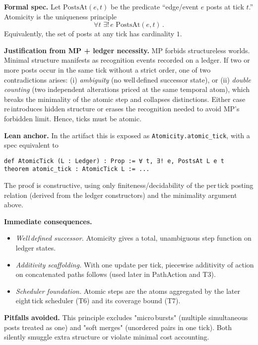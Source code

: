 \documentclass[11pt]{article}
\begin{document}
\medskip
\textbf{Formal spec.} Let $\mathrm{PostsAt}(e,t)$ be the predicate “edge/event $e$ posts at tick $t$.” Atomicity is the uniqueness principle
\begin{equation*}
  \forall t\,\, \exists!\, e\,\, \mathrm{PostsAt}(e,t)\,.
\end{equation*}
Equivalently, the set of posts at any tick has cardinality $1$.

\textbf{Justification from MP + ledger necessity.} MP forbids structureless worlds. Minimal structure manifests as recognition events recorded on a ledger. If two or more posts occur in the same tick without a strict order, one of two contradictions arises: (i) \emph{ambiguity} (no well\,defined successor state), or (ii) \emph{double\,counting} (two independent alterations priced at the same temporal atom), which breaks the minimality of the atomic step and collapses distinctions. Either case re\,introduces hidden structure or erases the recognition needed to avoid MP’s forbidden limit. Hence, ticks must be atomic.

\textbf{Lean anchor.} In the artifact this is exposed as \texttt{Atomicity.atomic\_tick}, with a spec equivalent to
\begin{verbatim}
def AtomicTick (L : Ledger) : Prop := ∀ t, ∃! e, PostsAt L e t
theorem atomic_tick : AtomicTick L := ...
\end{verbatim}
The proof is constructive, using only finiteness/decidability of the per\,tick posting relation (derived from the ledger constructors) and the minimality argument above.

\textbf{Immediate consequences.}
\begin{itemize}[leftmargin=*]
  \item \emph{Well\,defined successor.} Atomicity gives a total, unambiguous step function on ledger states.
  \item \emph{Additivity scaffolding.} With one update per tick, piecewise additivity of action on concatenated paths follows (used later in PathAction and T3).
  \item \emph{Scheduler foundation.} Atomic steps are the atoms aggregated by the later eight\,tick scheduler (T6) and its coverage bound (T7).
\end{itemize}

\textbf{Pitfalls avoided.} This principle excludes "micro\,bursts" (multiple simultaneous posts treated as one) and "soft merges" (unordered pairs in one tick). Both silently smuggle extra structure or violate minimal cost accounting.
\end{document}
